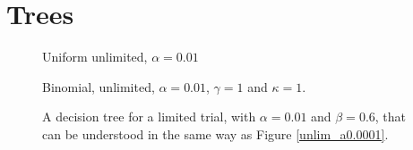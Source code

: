 \section{Trees}
%
%
%




\begin{figure}
    \centering
    \scalebox{0.8}{}
    \caption{Uniform unlimited, $\alpha = 0.01$}
    \label{unif_unlim_a0.01}
\end{figure}

\begin{figure}
    \centering
    \begin{minipage}[t]{0.45\textwidth} 
        \centering
        \scalebox{0.8}{}
        \caption{Binomial, unlimited, $\alpha = 0.01$, $\gamma=1$ and $\kappa=1$.}
        \label{binom_unlim_a0.01_g1_k1}
    \end{minipage}
    \hfill
    \centering
    \begin{minipage}[t]{0.45\textwidth} 
        \centering
        \scalebox{0.8}{}
        \caption{A decision tree for a limited trial, with $\alpha = 0.01$ and $\beta=0.6$, that can be understood in the same way as Figure \ref{unlim_a0.0001}.}
        \label{lim_a0.01_b0.6}
    \end{minipage}
\end{figure}